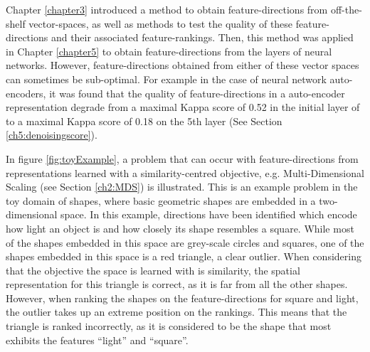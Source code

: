 
Chapter \ref{chapter3} introduced a method to obtain  feature-directions from off-the-shelf vector-spaces, as well as methods to test the quality of these feature-directions and their associated feature-rankings. Then, this method was applied in Chapter \ref{chapter5} to obtain feature-directions from the layers of neural networks. However, feature-directions obtained from either of these vector spaces can sometimes be sub-optimal. For example in the case of neural network auto-encoders, it was found that the quality of feature-directions in a auto-encoder representation degrade from a maximal Kappa score of 0.52 in the initial layer of to   a maximal Kappa score of 0.18 on the 5th layer (See Section \ref{ch5:denoisingscore}).  






 In figure \ref{fig:toyExample}, a problem that can occur with feature-directions from representations learned with a similarity-centred objective, e.g. Multi-Dimensional Scaling (see Section \ref{ch2:MDS}) is illustrated. This is an example problem in the toy domain of shapes, where  basic geometric shapes are embedded in a two-dimensional space. In this example, directions have been identified which encode how light an object is and how closely its shape resembles a square. While most of the shapes embedded in this space are grey-scale circles and squares, one of the shapes embedded in this space is a red triangle, a clear outlier. When considering that the objective the space is learned with is similarity, the spatial representation for this triangle  is correct,  as it is far from all the other shapes. However, when ranking the shapes on the feature-directions for square and light, the  outlier  takes up an extreme position on the rankings. This means that the triangle is ranked incorrectly, as it is considered to be the shape that most exhibits the features ``light'' and ``square''.

